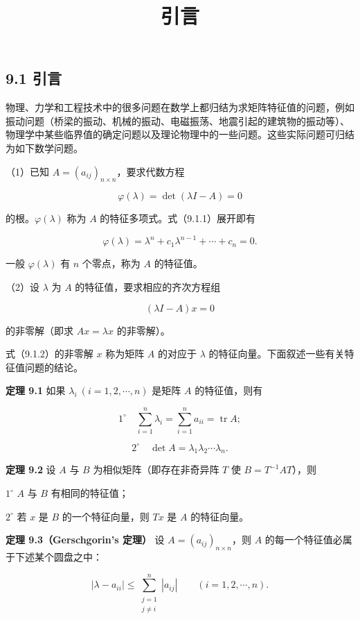 \documentclass[
  10pt,
  fontset=fandol]{ctexart}
\title{引言}
\author{}
\date{}
\begin{document}
\maketitle

\subsection{9.1 引言}\label{ux5f15ux8a00}

物理、力学和工程技术中的很多问题在数学上都归结为求矩阵特征值的问题，例如振动问题（桥梁的振动、机械的振动、电磁振荡、地震引起的建筑物的振动等）、物理学中某些临界值的确定问题以及理论物理中的一些问题。这些实际问题可归结为如下数学问题。

（1）已知 \(A=(a_{ij})_{n\times n}\)，要求代数方程

\[
\varphi(\lambda)=\det(\lambda I-A)=0
\tag{9.1.1}
\]

的根。\(\varphi(\lambda)\) 称为 \(A\) 的特征多项式。式（9.1.1）展开即有

\[
\varphi(\lambda)=\lambda^n+c_1\lambda^{n-1}+\cdots+c_n=0.
\]

一般 \(\varphi(\lambda)\) 有 \(n\) 个零点，称为 \(A\) 的特征值。

（2）设 \(\lambda\) 为 \(A\) 的特征值，要求相应的齐次方程组

\[
(\lambda I-A)x=0
\tag{9.1.2}
\]

的非零解（即求 \(Ax=\lambda x\) 的非零解）。

式（9.1.2）的非零解 \(x\) 称为矩阵 \(A\) 的对应于 \(\lambda\) 的特征向量。下面叙述一些有关特征值问题的结论。

\textbf{定理 9.1} 如果 \(\lambda_i\ (i=1,2,\cdots,n)\) 是矩阵 \(A\) 的特征值，则有

\[
1^\circ\quad \sum_{i=1}^n\lambda_i=\sum_{i=1}^na_{ii}=\operatorname{tr}A;
\]

\[
2^\circ\quad \det A=\lambda_1\lambda_2\cdots\lambda_n.
\]

\textbf{定理 9.2} 设 \(A\) 与 \(B\) 为相似矩阵（即存在非奇异阵 \(T\) 使 \(B=T^{-1}AT\)），则

\(1^\circ\) \(A\) 与 \(B\) 有相同的特征值；

\(2^\circ\) 若 \(x\) 是 \(B\) 的一个特征向量，则 \(Tx\) 是 \(A\) 的特征向量。

\textbf{定理 9.3（Gerschgorin's 定理）} 设 \(A=(a_{ij})_{n\times n}\)，则 \(A\) 的每一个特征值必属于下述某个圆盘之中：

\[
|\lambda-a_{ii}|\leq\sum_{\substack{j=1\\j\ne i}}^n|a_{ij}|\qquad(i=1,2,\cdots,n).
\]
\end{document}

